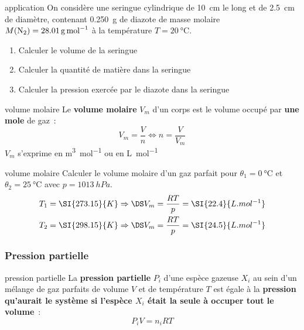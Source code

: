 \documentclass[../main/main.tex]{subfiles}
\begin{document}
\begin{exem}[label=exem:gp, sidebyside]{application}
    On considère une seringue cylindrique de \SI{10}{cm} le long et de
    \SI{2.5}{cm} de diamètre, contenant \SI{0.250}{g} de diazote de masse
    molaire $M({\rm N}_2) = \SI{28.01}{g.mol^{-1}}$ à la
    température $T = \SI{20}{\degreeCelsius}$.
    \begin{enumerate}
        \item Calculer le volume de la seringue
        \item Calculer la quantité de matière dans la seringue
        \item Calculer la pression exercée par le diazote dans la seringue
    \end{enumerate}
    \tcblower
\end{exem}
\begin{tcbraster}[raster columns=2, raster equal height=rows]
    \begin{defi}[label=def:volmol]{volume molaire}
        Le \textbf{volume molaire} $V_m$ d'un corps est le volume occupé par
        \textbf{une mole} de gaz~:
        \[\boxed{V_m = \frac{V}{n}} \Leftrightarrow n = \frac{V}{V_m}\]
        $V_m$ s'exprime en \si{m^3.mol^{-1}} ou en \si{L.mol^{-1}}
    \end{defi}
    \begin{exem}[label=exem:volmol]{volume molaire}
        Calculer le volume molaire d'un gaz parfait pour $\theta_1 =
        \SI{0}{\degreeCelsius}$ et $\theta_2 = \SI{25}{\degreeCelsius}$ avec $p
        = \SI{1013}{hPa}$.
        \tcblower
        \begin{gather*}
           T_1 = \SI{273.15}{K} \Rightarrow \DS V_m = \frac{RT}{p} =
                \SI{22.4}{L.mol^{-1}} \\
           T_2 = \SI{298.15}{K} \Rightarrow \DS V_m = \frac{RT}{p} =
                \SI{24.5}{L.mol^{-1}}
        \end{gather*}
    \end{exem}
\end{tcbraster}

\subsubsection{Pression partielle}
\begin{tcbraster}[raster columns=2, raster equal height=rows]
    \begin{defi}[label=def:ppartielle]{pression partielle}
        La \textbf{pression partielle} $P_i$ d'une espèce gazeuse $X_i$ au sein d'un
        mélange de gaz parfaits de volume $V$ et de température $T$ est égale à
        la \textbf{pression qu'aurait le système si l'espèce $X_i$ était la
        seule à occuper tout le volume}~:
        \[\boxed{P_iV = n_i RT}\]
    \end{defi}

\end{tcbraster}
\end{document}
